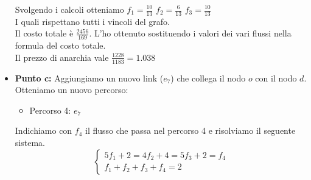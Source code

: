 \documentclass[a4paper,12pt]{article}
\begin{document}
\begin{itemize}
			Svolgendo i calcoli otteniamo $f_1=\frac{10}{13}$ $f_2=\frac{6}{13}$ $f_3=\frac{10}{13}$\\
			I quali rispettano tutti i vincoli del grafo.\\
			Il costo totale è $\frac{2456}{169}$. L'ho ottenuto sostituendo i valori dei vari flussi nella formula del costo totale.\\
			Il prezzo di anarchia vale $\frac{1228}{1183}=1.038$
			\item \textbf{Punto c: }Aggiungiamo un nuovo link ($e_7$) che collega il nodo $o$ con il nodo $d$.
			Otteniamo un nuovo percorso:
			\begin{itemize}
				\item Percorso 4: $e_7$
			\end{itemize}
			Indichiamo con $f_4$ il flusso che passa nel percorso 4 e risolviamo il seguente sistema.
			\begin{equation}
				\begin{cases}
					5f_1+2=4f_2+4=5f_3+2=f_4 \\
					f_1+f_2+f_3+f_4=2
				\end{cases}
			\end{equation}
			\end{itemize}
\end{document}
